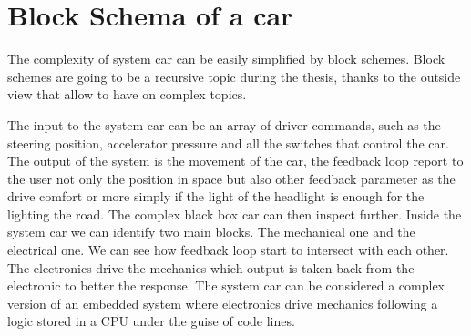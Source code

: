 \documentclass[../main.tex]{subfiles}
\begin{document}
\section{Block Schema of a car}
The complexity of system car can be easily simplified by block schemes. Block schemes are going to be a recursive topic during the thesis, thanks to the outside view that allow to have on complex topics. 

The input to the system car can be an array of driver commands, such as the steering position, accelerator pressure and all the switches that control the car. The output of the system is the movement of the car, the feedback loop report to the user not only the position in space but also other feedback parameter as the drive comfort or more simply if the light of the headlight is enough for the lighting the road. The complex black box car can then inspect further. Inside the system car we can identify two main blocks. The mechanical one and the electrical one. We can see how feedback loop start to intersect with each other. The electronics drive the mechanics which output is taken back from the electronic to better the response. The system car can be considered a complex version of an embedded system where electronics drive mechanics following a logic stored in a CPU under the guise of code lines. 


\cleardoublepage
\end{document}
